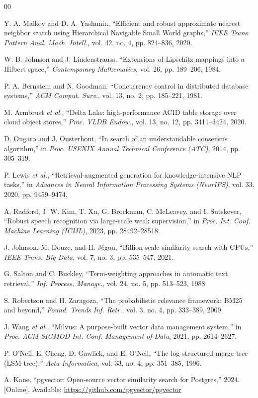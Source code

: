 \documentclass[conference]{IEEEtran}
\begin{document}
\begin{thebibliography}{00}

 Y. A. Malkov and D. A. Yashunin, ``Efficient and robust approximate nearest neighbor search using Hierarchical Navigable Small World graphs,'' \emph{IEEE Trans. Pattern Anal. Mach. Intell.}, vol. 42, no. 4, pp. 824--836, 2020.

 W. B. Johnson and J. Lindenstrauss, ``Extensions of Lipschitz mappings into a Hilbert space,'' \emph{Contemporary Mathematics}, vol. 26, pp. 189--206, 1984.

 P. A. Bernstein and N. Goodman, ``Concurrency control in distributed database systems,'' \emph{ACM Comput. Surv.}, vol. 13, no. 2, pp. 185--221, 1981.

 M. Armbrust \emph{et al.}, ``Delta Lake: high-performance ACID table storage over cloud object stores,'' \emph{Proc. VLDB Endow.}, vol. 13, no. 12, pp. 3411--3424, 2020.

 D. Ongaro and J. Ousterhout, ``In search of an understandable consensus algorithm,'' in \emph{Proc. USENIX Annual Technical Conference (ATC)}, 2014, pp. 305--319.

 P. Lewis \emph{et al.}, ``Retrieval-augmented generation for knowledge-intensive NLP tasks,'' in \emph{Advances in Neural Information Processing Systems (NeurIPS)}, vol. 33, 2020, pp. 9459--9474.

 A. Radford, J. W. Kim, T. Xu, G. Brockman, C. McLeavey, and I. Sutskever, ``Robust speech recognition via large-scale weak supervision,'' in \emph{Proc. Int. Conf. Machine Learning (ICML)}, 2023, pp. 28492--28518.

 J. Johnson, M. Douze, and H. J\'{e}gou, ``Billion-scale similarity search with GPUs,'' \emph{IEEE Trans. Big Data}, vol. 7, no. 3, pp. 535--547, 2021.

 G. Salton and C. Buckley, ``Term-weighting approaches in automatic text retrieval,'' \emph{Inf. Process. Manage.}, vol. 24, no. 5, pp. 513--523, 1988.

 S. Robertson and H. Zaragoza, ``The probabilistic relevance framework: BM25 and beyond,'' \emph{Found. Trends Inf. Retr.}, vol. 3, no. 4, pp. 333--389, 2009.

 J. Wang \emph{et al.}, ``Milvus: A purpose-built vector data management system,'' in \emph{Proc. ACM SIGMOD Int. Conf. Management of Data}, 2021, pp. 2614--2627.

 P. O'Neil, E. Cheng, D. Gawlick, and E. O'Neil, ``The log-structured merge-tree (LSM-tree),'' \emph{Acta Informatica}, vol. 33, no. 4, pp. 351--385, 1996.

 A. Kane, ``pgvector: Open-source vector similarity search for Postgres,'' 2024. [Online]. Available: \url{https://github.com/pgvector/pgvector}

\end{thebibliography}
\end{document}
